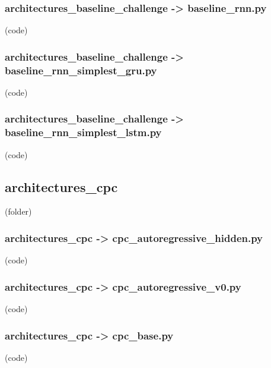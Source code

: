 \begin{myparindent}{0pt}

\noindent\subsubsection[baseline\_rnn.py]{architectures\_baseline\_challenge -> baseline\_rnn.py} (code)

\noindent\subsubsection[baseline\_rnn\_simplest\_gru.py]{architectures\_baseline\_challenge -> baseline\_rnn\_simplest\_gru.py} (code)

\noindent\subsubsection[baseline\_rnn\_simplest\_lstm.py]{architectures\_baseline\_challenge -> baseline\_rnn\_simplest\_lstm.py} (code)

\noindent\subsection[architectures\_cpc]{architectures\_cpc} (folder)
\noindent\subsubsection[cpc\_autoregressive\_hidden.py]{architectures\_cpc -> cpc\_autoregressive\_hidden.py} (code)

\noindent\subsubsection[cpc\_autoregressive\_v0.py]{architectures\_cpc -> cpc\_autoregressive\_v0.py} (code)

\noindent\subsubsection[cpc\_base.py]{architectures\_cpc -> cpc\_base.py} (code)

\end{myparindent}
